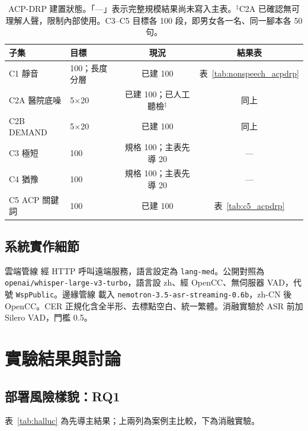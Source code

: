 \documentclass[11pt,a4paper]{article}
\newcommand{\CloudASR}{雲端管線}
\newcommand{\EdgeASR}{邊緣管線}
\begin{document}
\begin{table}[!t]
\centering
\footnotesize
\setlength{\tabcolsep}{7pt}
\renewcommand{\arraystretch}{1.05}
\begin{tabular}{@{}llcc@{}}
\toprule
\textbf{子集} & \textbf{目標} & \textbf{現況} & \textbf{結果表} \\
\midrule
C1 靜音 & 100；長度分層 & 已建 100 & 表~\ref{tab:nonspeech_acpdrp} \\
C2A 醫院底噪 & 5$\times$20 & 已建 100；已人工聽檢$^\ddagger$ & 同上 \\
C2B DEMAND & 5$\times$20 & 已建 100 & 同上 \\
C3 極短 & 100 & 規格 100；主表先導 20 & --- \\
C4 猶豫 & 100 & 規格 100；主表先導 20 & --- \\
C5 ACP 關鍵詞 & 100 & 已建 100 & 表~\ref{tab:c5_acpdrp} \\
\bottomrule
\end{tabular}
\caption{\label{tab:acpdrp_status} ACP-DRP 建置狀態。「---」表示完整規模結果尚未寫入主表。$^\ddagger$C2A 已確認無可理解人聲，限制內部使用。C3--C5 目標各 100 段，即男女各一名、同一腳本各 50 句。}
\end{table}

\subsection{系統實作細節}

\CloudASR{} 經 HTTP 呼叫遠端服務，語言設定為 \texttt{lang-med}。公開對照為 \texttt{openai/whisper-large-v3-turbo}，語言設 zh、經 OpenCC、無伺服器 VAD，代號 \texttt{WspPublic}。\EdgeASR{} 載入 \texttt{nemotron-3.5-asr-streaming-0.6b}，zh-CN 後 OpenCC。CER 正規化含全半形、去標點空白、統一繁體。消融實驗於 ASR 前加 Silero VAD，門檻 0.5。

\section{實驗結果與討論}

\subsection{部署風險樣貌：RQ1}

表~\ref{tab:halluc} 為先導主結果；上兩列為案例主比較，下為消融實驗。
\end{document}
